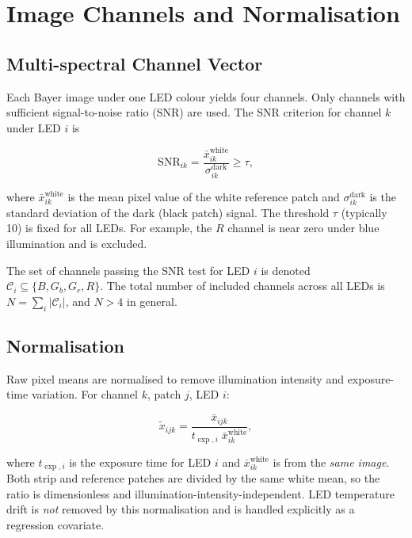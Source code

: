 \documentclass[11pt, a4paper]{article}
\begin{document}
\section{Image Channels and Normalisation}

\subsection{Multi-spectral Channel Vector}

Each Bayer image under one LED colour yields four channels.
Only channels with sufficient signal-to-noise ratio (SNR) are used.
The SNR criterion for channel $k$ under LED $i$ is

\begin{equation}
  \mathrm{SNR}_{ik}
    = \frac{\bar{x}_{ik}^{\mathrm{white}}}{\sigma_{ik}^{\mathrm{dark}}}
    \geq \tau,
  \label{eq:snr}
\end{equation}

where $\bar{x}_{ik}^{\mathrm{white}}$ is the mean pixel value of the
white reference patch and $\sigma_{ik}^{\mathrm{dark}}$ is the
standard deviation of the dark (black patch) signal.
The threshold $\tau$ (typically 10) is fixed for all LEDs.
For example, the $R$ channel is near zero under blue illumination and
is excluded.

The set of channels passing the SNR test for LED $i$ is denoted
$\mathcal{C}_i \subseteq \{B, G_b, G_r, R\}$.
The total number of included channels across all LEDs is
$N = \sum_i |\mathcal{C}_i|$, and $N > 4$ in general.

\subsection{Normalisation}

Raw pixel means are normalised to remove illumination intensity and
exposure-time variation.  For channel $k$, patch $j$, LED $i$:

\begin{equation}
  \tilde{x}_{ijk}
    = \frac{\bar{x}_{ijk}}{t_{\exp,i}\;\bar{x}_{ik}^{\mathrm{white}}},
  \label{eq:normalise}
\end{equation}

where $t_{\exp,i}$ is the exposure time for LED $i$ and
$\bar{x}_{ik}^{\mathrm{white}}$ is from the \emph{same image}.
Both strip and reference patches are divided by the same white mean,
so the ratio is dimensionless and illumination-intensity-independent.
LED temperature drift is \emph{not} removed by this normalisation and
is handled explicitly as a regression covariate.
\end{document}

